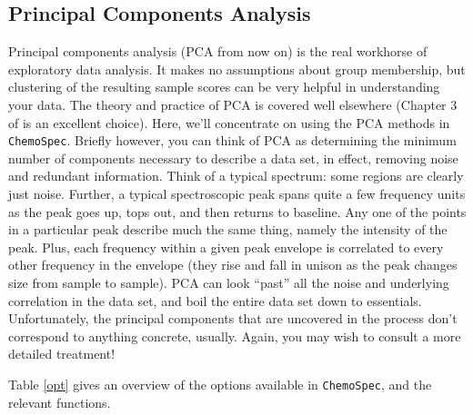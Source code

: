 \documentclass[letter,10pt,twocolumn,twoside,printwatermark=false]{pinp}
\begin{document}
\hypertarget{principal-components-analysis}{%
\subsection{Principal Components
Analysis}\label{principal-components-analysis}}

\label{sec-pca} Principal components analysis (PCA from now on) is the
real workhorse of exploratory data analysis. It makes no assumptions
about group membership, but clustering of the resulting sample scores
can be very helpful in understanding your data. The theory and practice
of PCA is covered well elsewhere (Chapter 3 of \cite{Filzmoser2009} is
an excellent choice). Here, we'll concentrate on using the PCA methods
in \texttt{ChemoSpec}. Briefly however, you can think of PCA as
determining the minimum number of components necessary to describe a
data set, in effect, removing noise and redundant information. Think of
a typical spectrum: some regions are clearly just noise. Further, a
typical spectroscopic peak spans quite a few frequency units as the peak
goes up, tops out, and then returns to baseline. Any one of the points
in a particular peak describe much the same thing, namely the intensity
of the peak. Plus, each frequency within a given peak envelope is
correlated to every other frequency in the envelope (they rise and fall
in unison as the peak changes size from sample to sample). PCA can look
``past'' all the noise and underlying correlation in the data set, and
boil the entire data set down to essentials. Unfortunately, the
principal components that are uncovered in the process don't correspond
to anything concrete, usually. Again, you may wish to consult a more
detailed treatment!

Table \ref{opt} gives an overview of the options available in
\texttt{ChemoSpec}, and the relevant functions.
\end{document}
